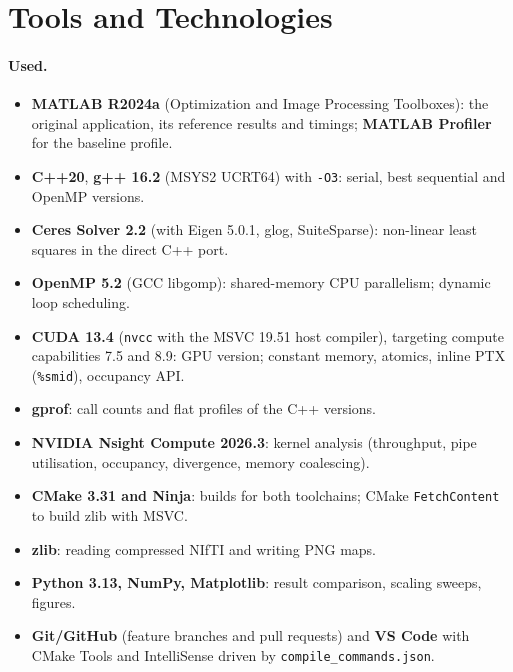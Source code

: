 \documentclass[11pt]{article}
\begin{document}
\section{Tools and Technologies}

\paragraph{Used.}
\begin{itemize}
    \item \textbf{MATLAB R2024a} (Optimization and Image Processing Toolboxes): the original
        application, its reference results and timings; \textbf{MATLAB Profiler} for the
        baseline profile.
    \item \textbf{C++20}, \textbf{g++ 16.2} (MSYS2 UCRT64) with \texttt{-O3}: serial, best
        sequential and OpenMP versions.
    \item \textbf{Ceres Solver 2.2} (with Eigen 5.0.1, glog, SuiteSparse): non-linear least
        squares in the direct C++ port.
    \item \textbf{OpenMP 5.2} (GCC libgomp): shared-memory CPU parallelism; dynamic loop scheduling.
    \item \textbf{CUDA 13.4} (\texttt{nvcc} with the MSVC 19.51 host compiler), targeting compute
        capabilities 7.5 and 8.9: GPU version; constant memory, atomics, inline PTX
        (\texttt{\%smid}), occupancy API.
    \item \textbf{gprof}: call counts and flat profiles of the C++ versions.
    \item \textbf{NVIDIA Nsight Compute 2026.3}: kernel analysis (throughput, pipe utilisation,
        occupancy, divergence, memory coalescing).
    \item \textbf{CMake 3.31 and Ninja}: builds for both toolchains; CMake \texttt{FetchContent}
        to build zlib with MSVC.
    \item \textbf{zlib}: reading compressed NIfTI and writing PNG maps.
    \item \textbf{Python 3.13, NumPy, Matplotlib}: result comparison, scaling sweeps, figures.
    \item \textbf{Git/GitHub} (feature branches and pull requests) and \textbf{VS Code} with
        CMake Tools and IntelliSense driven by \texttt{compile\_commands.json}.
\end{itemize}
\end{document}

